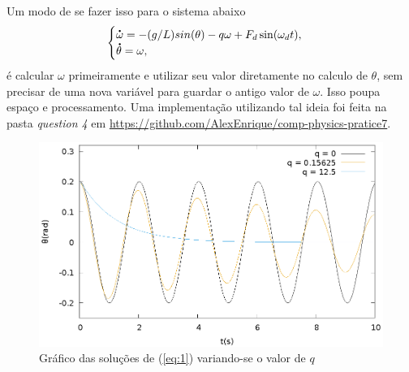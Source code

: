   Um modo de se fazer isso para o sistema abaixo
  \begin{equation}
    \begin{cases}
      \accentset{\mbox{\large\bfseries .}}{\omega} = -(g/L) sin(\theta) - q \omega + F_d \sin(\omega_d t), \\
      \accentset{\mbox{\large\bfseries .}}{\theta} = \omega,
    \end{cases}
    \label{eq:1}
  \end{equation}
  é calcular $\omega$ primeiramente e utilizar seu valor diretamente no calculo de $\theta$, sem precisar de uma nova variável para guardar o antigo valor de $\omega$. Isso poupa espaço e processamento. Uma implementação utilizando tal ideia foi feita na pasta \textit{question 4} em \url{https://github.com/AlexEnrique/comp-physics-pratice7}.
  \begin{figure}[h]
    \center
    \includegraphics[scale = .5]{q4Figs}
    \caption{Gráfico das soluções de (\ref{eq:1}) variando-se o valor de $q$}
  \end{figure}






